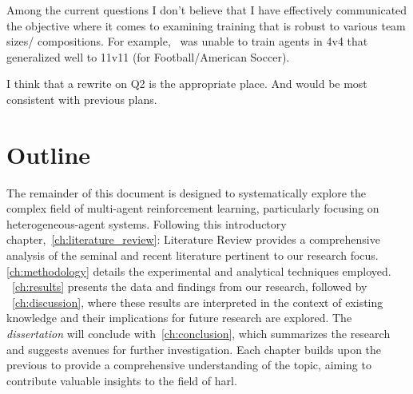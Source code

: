 \begin{comment}
    
\end{comment}

\begin{tcolorbox}[colback=blue!5,colframe=blue!50!black,title=Note to Editor]
    Among the current questions I don't believe that I have effectively communicated the
    objective where it comes to examining training that is robust to various team sizes/
    compositions. For example,~\cite{smit2023} was unable to train agents in 4v4 that generalized
    well to 11v11 (for Football/American Soccer).

    I think that a rewrite on Q2 is the appropriate place. 
    And would be most consistent with previous plans.
\end{tcolorbox}

\section{Outline}

The remainder of this document is designed to systematically explore the complex field of 
multi-agent reinforcement learning, particularly focusing on heterogeneous-agent systems.
Following this introductory chapter,~\ref{ch:literature_review}: Literature Review provides a 
comprehensive analysis of the seminal and recent literature pertinent to our research focus.%
\ref{ch:methodology} details the experimental and analytical techniques employed.
~\ref{ch:results} presents the data and findings from our research, followed by 
~\ref{ch:discussion}, where these results are interpreted in the context of existing 
knowledge and their implications for future research are explored.
The \emph{dissertation} will conclude with~\ref{ch:conclusion}, 
which summarizes the research and suggests avenues for further investigation. 
Each chapter builds upon the previous to provide a comprehensive understanding of the topic, 
aiming to contribute valuable insights to the field of \gls{harl}.

